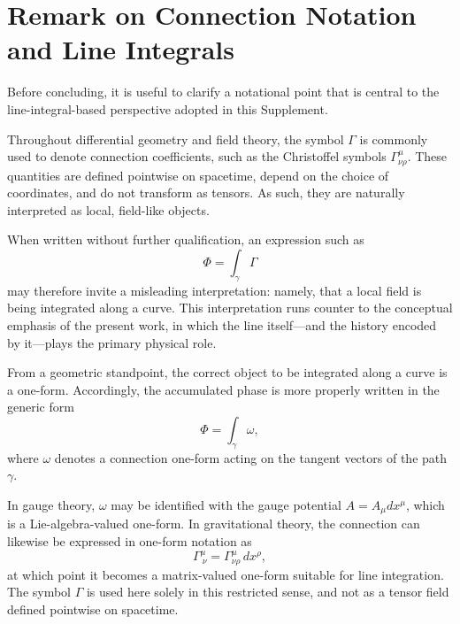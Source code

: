 \documentclass[12pt,letterpaper]{article}
\begin{document}
\section{Remark on Connection Notation and Line Integrals}

\justifying
Before concluding, it is useful to clarify a notational point that is central to the line-integral-based perspective adopted in this Supplement.

Throughout differential geometry and field theory, the symbol $\Gamma$ is commonly used to denote connection coefficients, such as the Christoffel symbols $\Gamma^\mu_{\nu\rho}$. These quantities are defined pointwise on spacetime, depend on the choice of coordinates, and do not transform as tensors.  
As such, they are naturally interpreted as local, field-like objects.

When written without further qualification, an expression such as
\begin{equation}
\Phi = \int_\gamma \Gamma
\end{equation}
may therefore invite a misleading interpretation: namely, that a local field is being integrated along a curve.  
This interpretation runs counter to the conceptual emphasis of the present work, in which the line itself—and the history encoded by it—plays the primary physical role.

From a geometric standpoint, the correct object to be integrated along a curve is a one-form. Accordingly, the accumulated phase is more properly written in the generic form
\begin{equation}
\Phi = \int_\gamma \omega ,
\end{equation}
where $\omega$ denotes a connection one-form acting on the tangent vectors of the path $\gamma$.

In gauge theory, $\omega$ may be identified with the gauge potential $A = A_\mu dx^\mu$, which is a Lie-algebra-valued one-form. In gravitational theory, the connection can likewise be expressed in one-form notation as
\begin{equation}
\Gamma^\mu_{\ \nu} = \Gamma^\mu_{\nu\rho}\, dx^\rho ,
\end{equation}
at which point it becomes a matrix-valued one-form suitable for line integration. The symbol $\Gamma$ is used here solely in this restricted sense, and not as a tensor field defined pointwise on spacetime.
\end{document}
